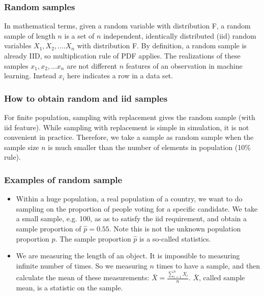 \documentclass[11pt]{article}
\begin{document}
\subsubsection{Random samples}\label{random-samples}

In mathematical terms, given a random variable with distribution F, a
random sample of length \(n\) is a set of \(n\) independent, identically
distributed (iid) random variables \(X_1, X_2, ….X_n\) with distribution
F. By definition, a random sample is already IID, so multiplication rule
of PDF applies. The realizations of these samples \(x_1, x_2, …x_n\) are
not different \(n\) features of an observation in machine learning.
Instead \(x_i\) here indicates a row in a data set.

\subsubsection{How to obtain random and iid
samples}\label{how-to-obtain-random-and-iid-samples}

For finite population, sampling with replacement gives the random sample
(with iid feature). While sampling with replacement is simple in
simulation, it is not convenient in practice. Therefore, we take a
sample as random sample when the sample size \(n\) is much smaller than
the number of elements in population (10\% rule).

\subsubsection{Examples of random
sample}\label{examples-of-random-sample}

\begin{itemize}
\item
  Within a huge population, a real population of a country, we want to
  do sampling on the proportion of people voting for a specific
  candidate. We take a small sample, e.g. 100, as as to satisfy the iid
  requirement, and obtain a sample proportion of \(\hat{p} = 0.55\).
  Note this is not the unknown population proportion \(p\). The sample
  proportion \(\hat{p}\) is a so-called statistics.
\item
  We are measuring the length of an object. It is impossible to
  measuring infinite number of times. So we measuring \(n\) times to
  have a sample, and then calculate the mean of these measurements:
  \(\bar{X} = \frac{\sum_{i=1}^n X_i}{n}\). \(\bar{X}\), called sample
  mean, is a statistic on the sample.
\end{itemize}
\end{document}
